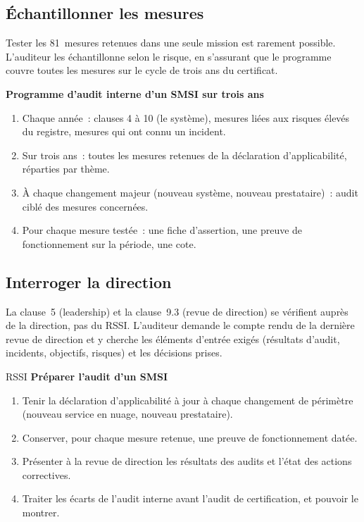 \subsection{Échantillonner les mesures}

Tester les 81~mesures retenues dans une seule mission est rarement
possible. L'auditeur les échantillonne selon le risque, en s'assurant que
le programme couvre toutes les mesures sur le cycle de trois ans du
certificat.

\begin{boxprocedure}
\textbf{Programme d'audit interne d'un SMSI sur trois ans}
\begin{enumerate}
    \item Chaque année~: clauses 4 à 10 (le système), mesures liées aux
          risques élevés du registre, mesures qui ont connu un incident.
    \item Sur trois ans~: toutes les mesures retenues de la déclaration
          d'applicabilité, réparties par thème.
    \item À chaque changement majeur (nouveau système, nouveau prestataire)~:
          audit ciblé des mesures concernées.
    \item Pour chaque mesure testée~: une fiche d'assertion, une preuve de
          fonctionnement sur la période, une cote.
\end{enumerate}
\end{boxprocedure}

\subsection{Interroger la direction}

La clause~5 (leadership) et la clause~9.3 (revue de direction) se
vérifient auprès de la direction, pas du RSSI. L'auditeur demande le
compte rendu de la dernière revue de direction et y cherche les éléments
d'entrée exigés (résultats d'audit, incidents, objectifs, risques) et les
décisions prises.

\begin{boxmetier}{RSSI}
\textbf{Préparer l'audit d'un SMSI}
\begin{enumerate}
    \item Tenir la déclaration d'applicabilité à jour à chaque changement
          de périmètre (nouveau service en nuage, nouveau prestataire).
    \item Conserver, pour chaque mesure retenue, une preuve de
          fonctionnement datée.
    \item Présenter à la revue de direction les résultats des audits et
          l'état des actions correctives.
    \item Traiter les écarts de l'audit interne avant l'audit de
          certification, et pouvoir le montrer.
\end{enumerate}
\end{boxmetier}

